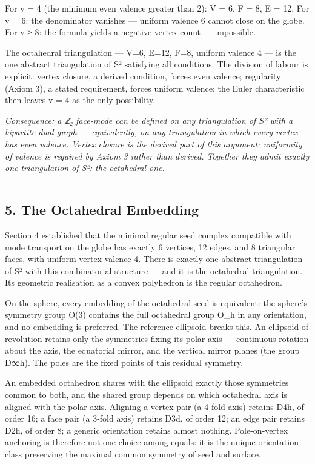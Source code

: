 \documentclass[
  11pt,
  a4paper,
]{article}
\begin{document}
For v = 4 (the minimum even valence greater than 2): V = 6, F = 8, E =
12. For v = 6: the denominator vanishes --- uniform valence 6 cannot
close on the globe. For v ≥ 8: the formula yields a negative vertex
count --- impossible.

The octahedral triangulation --- V=6, E=12, F=8, uniform valence 4 ---
is the one abstract triangulation of S² satisfying all conditions. The
division of labour is explicit: vertex closure, a derived condition,
forces even valence; regularity (Axiom 3), a stated requirement, forces
uniform valence; the Euler characteristic then leaves v = 4 as the only
possibility.

\emph{Consequence: a ℤ₂ face-mode can be defined on any triangulation of
S² with a bipartite dual graph --- equivalently, on any triangulation in
which every vertex has even valence. Vertex closure is the derived part
of this argument; uniformity of valence is required by Axiom 3 rather
than derived. Together they admit exactly one triangulation of S²: the
octahedral one.}

\begin{center}\rule{0.5\linewidth}{0.5pt}\end{center}

\subsection{5. The Octahedral Embedding}\label{the-octahedral-embedding}

Section 4 established that the minimal regular seed complex compatible
with mode transport on the globe has exactly 6 vertices, 12 edges, and 8
triangular faces, with uniform vertex valence 4. There is exactly one
abstract triangulation of S² with this combinatorial structure --- and
it is the octahedral triangulation. Its geometric realisation as a
convex polyhedron is the regular octahedron.

On the sphere, every embedding of the octahedral seed is equivalent: the
sphere's symmetry group O(3) contains the full octahedral group O\_h in
any orientation, and no embedding is preferred. The reference ellipsoid
breaks this. An ellipsoid of revolution retains only the symmetries
fixing its polar axis --- continuous rotation about the axis, the
equatorial mirror, and the vertical mirror planes (the group D∞h). The
poles are the fixed points of this residual symmetry.

An embedded octahedron shares with the ellipsoid exactly those
symmetries common to both, and the shared group depends on which
octahedral axis is aligned with the polar axis. Aligning a vertex pair
(a 4-fold axis) retains D4h, of order 16; a face pair (a 3-fold axis)
retains D3d, of order 12; an edge pair retains D2h, of order 8; a
generic orientation retains almost nothing. Pole-on-vertex anchoring is
therefore not one choice among equals: it is the unique orientation
class preserving the maximal common symmetry of seed and surface.
\end{document}
